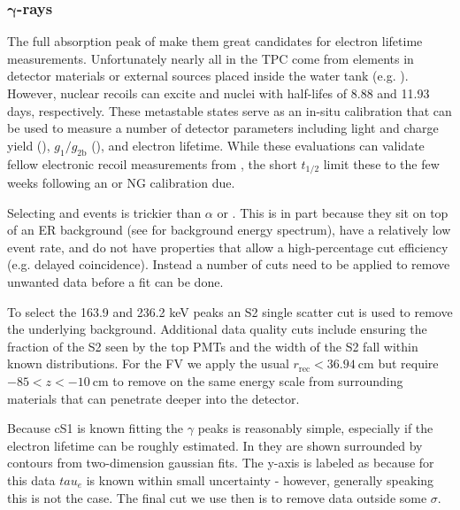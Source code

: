 \subsubsection{$\mathbf{\gamma}$-rays}
\label{subsec:electron_lifetimes_measurement_gammas}
The full absorption peak of \gammarays make them great candidates for electron lifetime measurements.  Unfortunately nearly all
\gammarays in the TPC come from elements in detector materials or external sources placed inside the water tank
(e.g. ).  However, nuclear recoils can excite  and  nuclei with half-lifes
of 8.88 and 11.93 days, respectively.  These metastable states serve as an in-situ calibration that can be used to measure a number of
detector parameters including light and charge yield (), $g_1/g_{2\mathrm{b}}$
(), and electron lifetime.  While these evaluations can validate fellow
electronic recoil measurements from , the short $t_{1/2}$ limit these to the few weeks following an \ambe or NG
calibration due.

Selecting  and  events is trickier than $\alpha$ or .  This is in part because they sit
on top of an ER background (see  for background energy spectrum), have a
relatively low event rate, and do not have properties that allow a high-percentage cut
efficiency (e.g.  delayed coincidence).  Instead a number of cuts need to be applied to remove unwanted data before a fit
can be done.

To select the 163.9 and 236.2 keV peaks an S2 single scatter cut is used to remove the underlying background.  Additional data quality
cuts include ensuring the fraction of the S2 seen by the top PMTs and the width of the S2 fall within known distributions.  For the FV
we apply the usual $r_{\mathrm{rec}} < 36.94\ \mathrm{cm}$ but require $-85 < z < -10\ \mathrm{cm}$ to remove \gammarays on the same
energy scale from surrounding materials that can penetrate deeper into the detector.

Because cS1 is known fitting the $\gamma$ peaks is reasonably simple, especially if the electron lifetime can be roughly estimated.  In
 they are shown surrounded by contours from two-dimension gaussian fits.  The
y-axis is labeled as \cstwob because for this data $tau_e$ is known within small uncertainty - however, generally speaking this is not
the case.  The final cut we use then is to remove data outside some $\sigma$.

